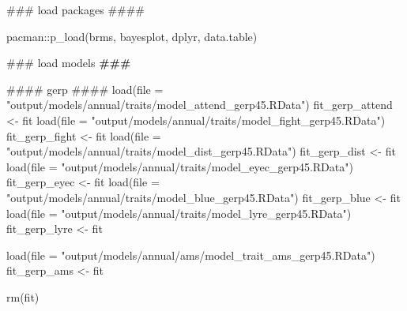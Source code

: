 \documentclass[
  letterpaper,
  DIV=11,
  numbers=noendperiod]{scrreprt}
\newenvironment{Shaded}{}{}
\newcommand{\AlertTok}[1]{\textcolor[rgb]{1.00,0.33,0.33}{\textbf{#1}}}
\newcommand{\AttributeTok}[1]{\textcolor[rgb]{0.84,0.23,0.29}{#1}}
\newcommand{\DocumentationTok}[1]{\textcolor[rgb]{0.42,0.45,0.49}{#1}}
\newcommand{\FunctionTok}[1]{\textcolor[rgb]{0.44,0.26,0.76}{#1}}
\newcommand{\NormalTok}[1]{\textcolor[rgb]{0.14,0.16,0.18}{#1}}
\newcommand{\OtherTok}[1]{\textcolor[rgb]{0.44,0.26,0.76}{#1}}
\newcommand{\SpecialCharTok}[1]{\textcolor[rgb]{0.00,0.36,0.77}{#1}}
\newcommand{\StringTok}[1]{\textcolor[rgb]{0.01,0.18,0.38}{#1}}
\begin{document}
\begin{Shaded}
\begin{Highlighting}[]
\DocumentationTok{\#\#\# load packages \#\#\#\#}

\NormalTok{pacman}\SpecialCharTok{::}\FunctionTok{p\_load}\NormalTok{(brms, bayesplot, dplyr, data.table)}

\DocumentationTok{\#\#\# load models }\AlertTok{\#\#\#}

\DocumentationTok{\#\#\#\# gerp \#\#\#\#}
\FunctionTok{load}\NormalTok{(}\AttributeTok{file =} \StringTok{"output/models/annual/traits/model\_attend\_gerp45.RData"}\NormalTok{)}
\NormalTok{fit\_gerp\_attend }\OtherTok{\textless{}{-}}\NormalTok{ fit}
\FunctionTok{load}\NormalTok{(}\AttributeTok{file =} \StringTok{"output/models/annual/traits/model\_fight\_gerp45.RData"}\NormalTok{)}
\NormalTok{fit\_gerp\_fight }\OtherTok{\textless{}{-}}\NormalTok{ fit}
\FunctionTok{load}\NormalTok{(}\AttributeTok{file =} \StringTok{"output/models/annual/traits/model\_dist\_gerp45.RData"}\NormalTok{)}
\NormalTok{fit\_gerp\_dist }\OtherTok{\textless{}{-}}\NormalTok{ fit}
\FunctionTok{load}\NormalTok{(}\AttributeTok{file =} \StringTok{"output/models/annual/traits/model\_eyec\_gerp45.RData"}\NormalTok{)}
\NormalTok{fit\_gerp\_eyec }\OtherTok{\textless{}{-}}\NormalTok{ fit}
\FunctionTok{load}\NormalTok{(}\AttributeTok{file =} \StringTok{"output/models/annual/traits/model\_blue\_gerp45.RData"}\NormalTok{)}
\NormalTok{fit\_gerp\_blue }\OtherTok{\textless{}{-}}\NormalTok{ fit}
\FunctionTok{load}\NormalTok{(}\AttributeTok{file =} \StringTok{"output/models/annual/traits/model\_lyre\_gerp45.RData"}\NormalTok{)}
\NormalTok{fit\_gerp\_lyre }\OtherTok{\textless{}{-}}\NormalTok{ fit}

\FunctionTok{load}\NormalTok{(}\AttributeTok{file =} \StringTok{"output/models/annual/ams/model\_trait\_ams\_gerp45.RData"}\NormalTok{)}
\NormalTok{fit\_gerp\_ams }\OtherTok{\textless{}{-}}\NormalTok{ fit}

\FunctionTok{rm}\NormalTok{(fit)}


\end{Highlighting}
\end{Shaded}
\end{document}
